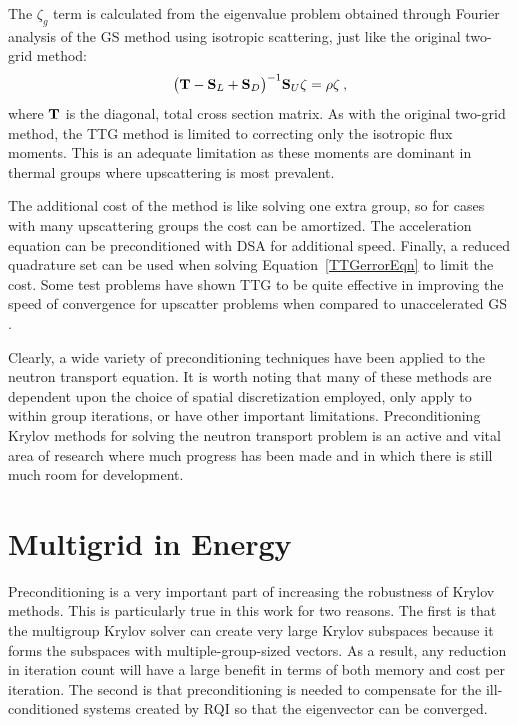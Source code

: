 The $\zeta_g$ term is calculated from the eigenvalue problem obtained through Fourier analysis of the GS method using isotropic scattering, just like the original two-grid method:
%
\begin{equation}
  \bigl(\mathbf{T} - \mathbf{S}_L + \mathbf{S}_D\bigr)^{-1} \mathbf{S}_U\zeta = \rho\zeta \:,
\end{equation}
where $\mathbf{T}$ is the diagonal, total cross section matrix. As with the original two-grid method, the TTG method is limited to correcting only the isotropic flux moments. This is an adequate limitation as these moments are dominant in thermal groups where upscattering is most prevalent\cite{Evans2009d}.   

The additional cost of the method is like solving one extra group, so for cases with many upscattering groups the cost can be amortized. The acceleration equation can be preconditioned with DSA for additional speed. Finally, a reduced quadrature set can be used when solving Equation~\eqref{TTGerrorEqn} to limit the cost. Some test problems have shown TTG to be quite effective in improving the speed of convergence for upscatter problems when compared to unaccelerated GS \cite{Evans2009d}.

Clearly, a wide variety of preconditioning techniques have been applied to the neutron transport equation. It is worth noting that many of these methods are dependent upon the choice of spatial discretization employed, only apply to within group iterations, or have other important limitations. Preconditioning Krylov methods for solving the neutron transport problem is an active and vital area of research where much progress has been made and in which there is still much room for development. 

\section{Multigrid in Energy}
Preconditioning is a very important part of increasing the robustness of Krylov methods. This is particularly true in this work for two reasons. The first is that the multigroup Krylov solver can create very large Krylov subspaces because it forms the subspaces with multiple-group-sized vectors. As a result, any reduction in iteration count will have a large benefit in terms of both memory and cost per iteration. The second is that preconditioning is needed to compensate for the ill-conditioned systems created by RQI so that the eigenvector can be converged. 

